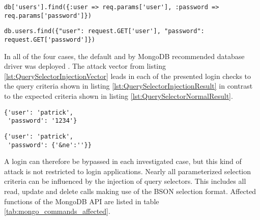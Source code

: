 \begin{lstlisting}[caption={Vulnerable Ruby example for query selector injection against MongoDB}, label={lst:RubyQuerySelectorInjection}]
db['users'].find({:user => req.params['user'], :password => req.params['password']})
\end{lstlisting}

\begin{lstlisting}[caption={Vulnerable Python example for query selector injection against MongoDB}, label={lst:PythonQuerySelectorInjection}]
db.users.find({"user": request.GET['user'], "password": request.GET['password']})
\end{lstlisting}

In all of the four cases, the default and by MongoDB recommended database driver was deployed \cite{MongoDB_Drivers2016}. The attack vector from listing \ref{lst:QuerySelectorInjectionVector} leads in each of the presented login checks to the query criteria shown in listing \ref{lst:QuerySelectorInjectionResult} in contrast to the expected criteria shown in listing \ref{lst:QuerySelectorNormalResult}. \\

\begin{minipage}{.97\textwidth}
\begin{minipage}[t]{.49\textwidth}
\begin{lstlisting}[caption={Resulting query of normal request}, label={lst:QuerySelectorNormalResult}]
{'user': 'patrick', 
 'password': '1234'}
\end{lstlisting}
\end{minipage}
\hfill
\begin{minipage}[t]{.49\textwidth}
\begin{lstlisting}[escapechar=!,caption={Resulting query of query selector injection}, label={lst:QuerySelectorInjectionResult}]
{'user': 'patrick',
 'password': {'&ne':''}}
\end{lstlisting}
\end{minipage}
\end{minipage}

A login can therefore be bypassed in each investigated case, but this kind of attack is not restricted to login applications. Nearly all parameterized selection criteria can be influenced by the injection of query selectors. This includes all read, update and delete calls making use of the BSON selection format. Affected functions of the MongoDB API are listed in table \ref{tab:mongo_commands_affected}.\\

